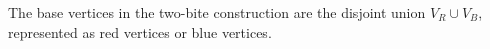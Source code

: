 \begin{definition}
The base vertices in the two-bite construction are the disjoint union
\(V_R\cup V_B\), represented as red vertices or blue vertices.
\end{definition}
